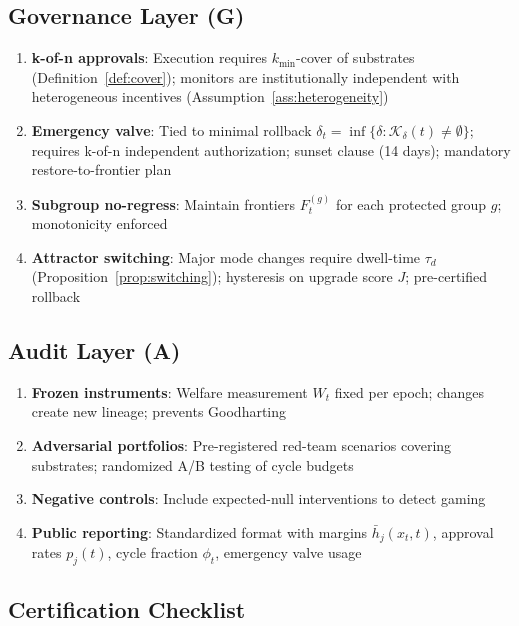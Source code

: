 \documentclass[11pt,a4paper]{article}
\begin{document}
\subsection{Governance Layer (G)}

\begin{enumerate}
\item \textbf{k-of-n approvals}: Execution requires $k_{\min}$-cover of substrates (Definition~\ref{def:cover}); monitors are institutionally independent with heterogeneous incentives (Assumption~\ref{ass:heterogeneity})
\item \textbf{Emergency valve}: Tied to minimal rollback $\delta_t = \inf\{\delta: \mathcal{K}_\delta(t) \neq \emptyset\}$; requires k-of-n independent authorization; sunset clause (14 days); mandatory restore-to-frontier plan
\item \textbf{Subgroup no-regress}: Maintain frontiers $F_t^{(g)}$ for each protected group $g$; monotonicity enforced
\item \textbf{Attractor switching}: Major mode changes require dwell-time $\tau_d$ (Proposition~\ref{prop:switching}); hysteresis on upgrade score $J$; pre-certified rollback
\end{enumerate}

\subsection{Audit Layer (A)}

\begin{enumerate}
\item \textbf{Frozen instruments}: Welfare measurement $W_t$ fixed per epoch; changes create new lineage; prevents Goodharting
\item \textbf{Adversarial portfolios}: Pre-registered red-team scenarios covering substrates; randomized A/B testing of cycle budgets
\item \textbf{Negative controls}: Include expected-null interventions to detect gaming
\item \textbf{Public reporting}: Standardized format with margins $\bar{h}_j(x_t,t)$, approval rates $p_j(t)$, cycle fraction $\phi_t$, emergency valve usage
\end{enumerate}

\subsection{Certification Checklist}
\end{document}

